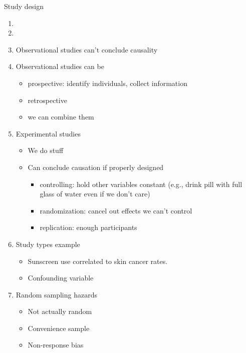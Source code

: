 \documentclass{article}
\begin{document}
Study design
\begin{enumerate}
\item {}
\item {}
\item Observational studies can't conclude causality
\item Observational studies can be
  \begin{itemize}
  \item prospective: identify individuals, collect information
  \item retrospective
  \item we can combine them
  \end{itemize}
\item Experimental studies
  \begin{itemize}
  \item We do stuff
  \item Can conclude causation if properly designed
    \begin{itemize}
    \item controlling: hold other variables constant (e.g., drink pill
      with full glass of water even if we don't care)
    \item randomization: cancel out effects we can't control
    \item replication: enough participants
    \end{itemize}
  \end{itemize}
\item Study types example
  \begin{itemize}
  \item Sunscreen use correlated to skin cancer rates.
  \item Confounding variable
  \end{itemize}
\item Random sampling hazards
  \begin{itemize}
  \item Not actually random
  \item Convenience sample
  \item Non-response bias
  \end{itemize}
\end{enumerate}
\end{document}
